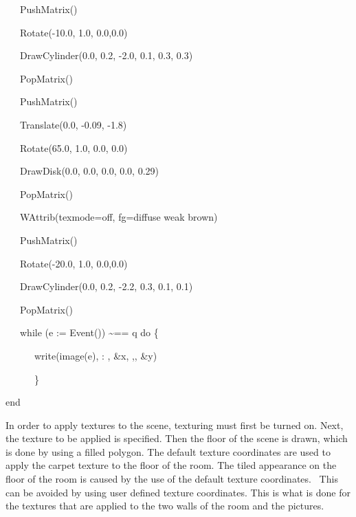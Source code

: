 \documentclass[letterpaper]{article}
\begin{document}
\bigskip

{\sffamily
\ \ \ PushMatrix()}

{\sffamily
\ \ \ Rotate(-10.0, 1.0, 0.0,0.0)}

{\sffamily
\ \ \ DrawCylinder(0.0, 0.2, -2.0, 0.1, 0.3, 0.3)}

{\sffamily
\ \ \ PopMatrix()}


\bigskip

{\sffamily
\ \ \ PushMatrix()}

{\sffamily
\ \ \ Translate(0.0, -0.09, -1.8)}

{\sffamily
\ \ \ Rotate(65.0, 1.0, 0.0, 0.0)}

{\sffamily
\ \ \ DrawDisk(0.0, 0.0, 0.0, 0.0, 0.29) }

{\sffamily
\ \ \ PopMatrix()}


\bigskip

{\sffamily
\ \ \ WAttrib({\textquotedbl}texmode=off{\textquotedbl}, {\textquotedbl}fg=diffuse weak brown{\textquotedbl})}

{\sffamily
\ \ \ PushMatrix()}

{\sffamily
\ \ \ Rotate(-20.0, 1.0, 0.0,0.0)}

{\sffamily
\ \ \ DrawCylinder(0.0, 0.2, -2.2, 0.3, 0.1, 0.1)}

{\sffamily
\ \ \ PopMatrix()}

{\sffamily
\ \ \ while (e := Event()) \~{}== {\textquotedbl}q{\textquotedbl} do \{}

{\sffamily
\ \ \ \ \ \ write(image(e), {\textquotedbl}: {\textquotedbl}, \&x, {\textquotedbl},{\textquotedbl}, \&y)}

{\sffamily
\ \ \ \ \ \ \}}

{\sffamily
end}


\bigskip

{
In order to apply textures to the scene, texturing must first be turned on. Next, the texture to be applied is
specified. Then the floor of the scene is drawn, which is done by using a filled polygon. The default texture
coordinates are used to apply the carpet texture to the floor of the room. The tiled appearance on the floor of the
room is caused by the use of the default texture coordinates. \ This can be avoided by using user defined texture
coordinates. This is what is done for the textures that are applied to the two walls of the room and the pictures. }
\end{document}
